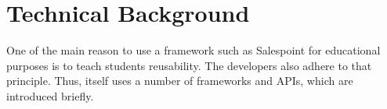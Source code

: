 \chapter{Technical Background}
One of the main reason to use a framework such as Salespoint for educational purposes is to teach students reusability.
The \salespoint developers also adhere to that principle.
Thus, \salespoint itself uses a number of frameworks and APIs, which are introduced briefly.



